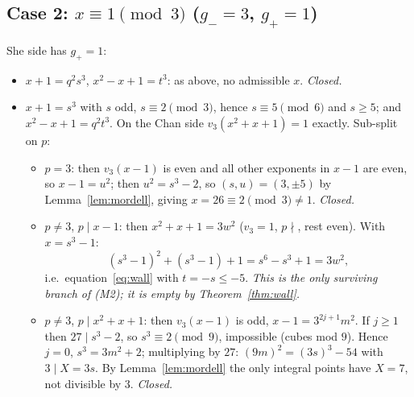 \documentclass[11pt]{article}
\theoremstyle{remark}
\newcommand{\vp}{v}
\begin{document}
\subsection*{Case 2: $x\equiv1\pmod3$ ($g_-=3$, $g_+=1$)}
She side has $g_+=1$:
\begin{itemize}
\item[(b)] $x+1=q^2s^3$, $x^2-x+1=t^3$: as above, no admissible $x$. \emph{Closed.}
\item[(a)] $x+1=s^3$ with $s$ odd, $s\equiv2\pmod3$, hence $s\equiv5\pmod 6$ and $s\ge5$; and $x^2-x+1=q^2t^3$. On the Chan side $\vp_3(x^2+x+1)=1$ exactly. Sub-split on $p$:
  \begin{itemize}
  \item $p=3$: then $\vp_3(x-1)$ is even and all other exponents in $x-1$ are even, so $x-1=u^2$; then $u^2=s^3-2$, so $(s,u)=(3,\pm5)$ by Lemma~\ref{lem:mordell}, giving $x=26\equiv2\pmod3\neq1$. \emph{Closed.}
  \item $p\neq3$, $p\mid x-1$: then $x^2+x+1=3w^2$ ($\vp_3=1$, $p\nmid$, rest even). With $x=s^3-1$:
  \[
  (s^3-1)^2+(s^3-1)+1=s^6-s^3+1=3w^2,
  \]
  i.e.\ equation~\eqref{eq:wall} with $t=-s\le-5$. \emph{This is the only surviving branch of (M2); it is empty by Theorem~\ref{thm:wall}.}
  \item $p\neq3$, $p\mid x^2+x+1$: then $\vp_3(x-1)$ is odd, $x-1=3^{2j+1}m^2$. If $j\ge1$ then $27\mid s^3-2$, so $s^3\equiv2\pmod 9$, impossible (cubes mod $9$). Hence $j=0$, $s^3=3m^2+2$; multiplying by $27$: $(9m)^2=(3s)^3-54$ with $3\mid X=3s$. By Lemma~\ref{lem:mordell} the only integral points have $X=7$, not divisible by $3$. \emph{Closed.}
  \end{itemize}
\end{itemize}
\end{document}
